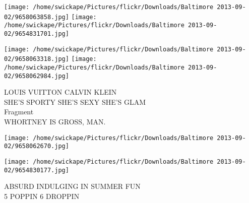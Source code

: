 \documentclass[10pt,letterpaper]{article}
\begin{document}
\texttt{[image: /home/swickape/Pictures/flickr/Downloads/Baltimore 2013-09-02/9658063858.jpg]}
\texttt{[image: /home/swickape/Pictures/flickr/Downloads/Baltimore 2013-09-02/9654831701.jpg]}

\texttt{[image: /home/swickape/Pictures/flickr/Downloads/Baltimore 2013-09-02/9658063318.jpg]}
\texttt{[image: /home/swickape/Pictures/flickr/Downloads/Baltimore 2013-09-02/9658062984.jpg]}

LOUIS VUITTON CALVIN KLEIN\\
SHE'S SPORTY SHE'S SEXY SHE'S GLAM\\
Fragment\\
WHORTNEY IS GROSS, MAN.\\
\pagebreak

\texttt{[image: /home/swickape/Pictures/flickr/Downloads/Baltimore 2013-09-02/9658062670.jpg]}

\vspace{0.25in}
\texttt{[image: /home/swickape/Pictures/flickr/Downloads/Baltimore 2013-09-02/9654830177.jpg]}

ABSURD INDULGING IN SUMMER FUN\\
5 POPPIN 6 DROPPIN\\
\pagebreak
\end{document}
